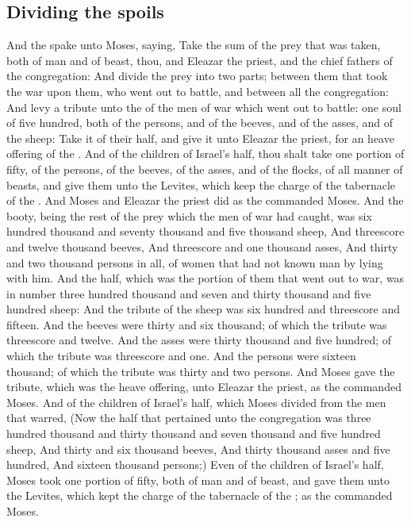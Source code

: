\begin{biblechapter}
\section*{Dividing the spoils}
\verse And the \LORD spake unto Moses, saying,
\verse Take the sum of the prey that was taken, both of man and of beast, thou, and Eleazar the priest, and the chief fathers of the congregation:
\verse And divide the prey into two parts; between them that took the war upon them, who went out to battle, and between all the congregation:
\verse And levy a tribute unto the \LORD of the men of war which went out to battle: one soul of five hundred, both of the persons, and of the beeves, and of the asses, and of the sheep:
\verse Take it of their half, and give it unto Eleazar the priest, for an heave offering of the \LORD.
\verse And of the children of Israel's half, thou shalt take one portion of fifty, of the persons, of the beeves, of the asses, and of the flocks, of all manner of beasts, and give them unto the Levites, which keep the charge of the tabernacle of the \LORD.
\verse And Moses and Eleazar the priest did as the \LORD commanded Moses.
\verse And the booty, being the rest of the prey which the men of war had caught, was six hundred thousand and seventy thousand and five thousand sheep,
\verse And threescore and twelve thousand beeves,
\verse And threescore and one thousand asses,
\verse And thirty and two thousand persons in all, of women that had not known man by lying with him.
\verse And the half, which was the portion of them that went out to war, was in number three hundred thousand and seven and thirty thousand and five hundred sheep:
\verse And the \LORDs tribute of the sheep was six hundred and threescore and fifteen.
\verse And the beeves were thirty and six thousand; of which the \LORDs tribute was threescore and twelve.
\verse And the asses were thirty thousand and five hundred; of which the \LORDs tribute was threescore and one.
\verse And the persons were sixteen thousand; of which the \LORDs tribute was thirty and two persons.
\verse And Moses gave the tribute, which was the \LORDs heave offering, unto Eleazar the priest, as the \LORD commanded Moses.
\verse And of the children of Israel's half, which Moses divided from the men that warred,
\verse (Now the half that pertained unto the congregation was three hundred thousand and thirty thousand and seven thousand and five hundred sheep,
\verse And thirty and six thousand beeves,
\verse And thirty thousand asses and five hundred,
\verse And sixteen thousand persons;)
\verse Even of the children of Israel's half, Moses took one portion of fifty, both of man and of beast, and gave them unto the Levites, which kept the charge of the tabernacle of the \LORD; as the \LORD commanded Moses.

\end{biblechapter}
